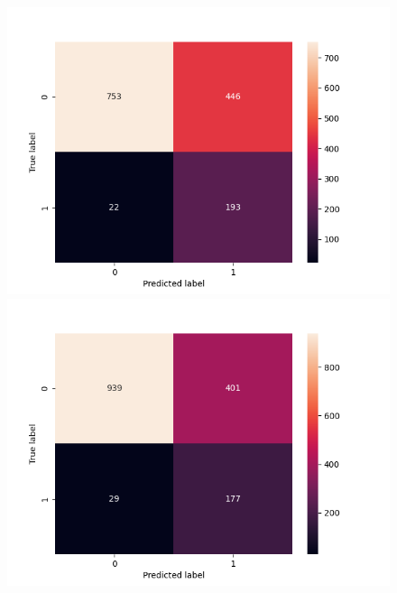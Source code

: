 \begin{figure}[h!]
    \includegraphics[width=\linewidth]{figures/results/ad-hoc/nn/calibrate/2021-12-06_17.03.17.314982_set_3_confusion_matrix_raw.png}
    \endminipage
    \includegraphics[width=\linewidth]{figures/results/ad-hoc/nn/calibrate/2021-12-06_17.03.17.314982_set_4_confusion_matrix_raw.png}
    \endminipage


\end{figure}
